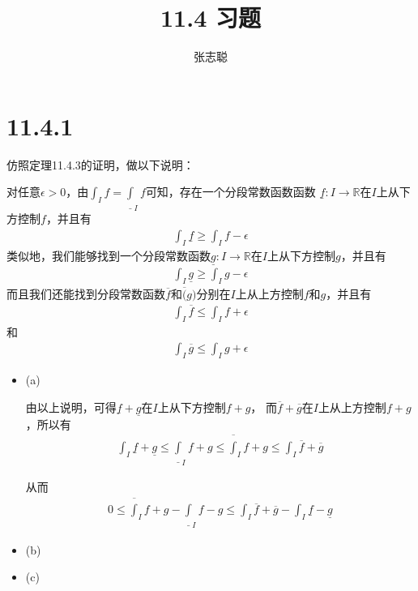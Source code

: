 \documentclass{article}
\begin{document}
\title{11.4 习题}
\author{张志聪}
\maketitle

\section*{11.4.1}

仿照定理11.4.3的证明，做以下说明：

对任意$\epsilon > 0$，由$\int_I f = \underline{\int}_I f$可知，存在一个分段常数函数函数
$\underline{f} : I \to \mathbb{R}$在$I$上从下方控制$f$，并且有
\begin{align*}
  \int_I \underline{f} \geq \int_I f - \epsilon
\end{align*}
类似地，我们能够找到一个分段常数函数$\underline{g}: I \to \mathbb{R}$在$I$上从下方控制$g$，并且有
\begin{align*}
  \int_I \underline{g} \geq \int_I g - \epsilon
\end{align*}
而且我们还能找到分段常数函数$\overline{f}$和$\overline(g)$分别在$I$上从上方控制$f$和$g$，并且有
\begin{align*}
  \int_I \overline{f} \leq \int_I f + \epsilon
\end{align*}
和
\begin{align*}
  \int_I \overline{g} \leq \int_I g + \epsilon
\end{align*}

\begin{itemize}
  \item (a)

        由以上说明，可得$\underline{f} + \underline{g}$在$I$上从下方控制$f + g$，
        而$\overline{f} + \overline{g}$在$I$上从上方控制$f + g$，所以有
        \begin{align*}
          \int_{I} \underline{f} + \underline{g} \leq \underline{\int}_I f + g \leq \overline{\int}_I f + g \leq \int_I \overline{f} + \overline{g} 
        \end{align*}

        从而
        \begin{align*}
          0 \leq \overline{\int}_I f + g - \underline{\int}_I f - g \leq \int_I \overline{f} + \overline{g} - \int_I \underline{f} - \underline{g}
        \end{align*}

  \item (b)
  \item (c)
\end{itemize}
\end{document}
